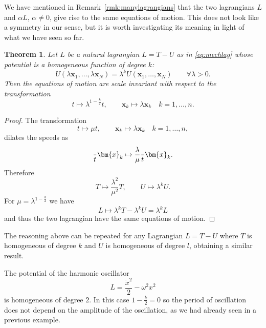 \documentclass[english,fontsize=11pt,paper=a5,oneside]{scrbook}
\newcommand{\bx}{\bm{x}}
\let\d\relax
\newcommand{\d}{\mathrm{d}}
\newtheorem{theorem}{Theorem}[chapter]
\theoremstyle{definition}
\newenvironment{remark}
  {\pushQED{\qed}\renewcommand{\qedsymbol}{$\lozenge$}\remarkx}
  {\popQED\endremarkx}
\newenvironment{example}
  {\pushQED{\qed}\renewcommand{\qedsymbol}{$\lozenge$}\examplex}
  {\popQED\endexamplex}
\begin{document}
We have mentioned in Remark~\ref{rmk:manylagrangians} that the two lagrangians $L$ and $\alpha L$, $\alpha\neq0$, give rise to the same equations of motion.
This does not look like a symmetry in our sense, but it is worth investigating its meaning in light of what we have seen so far.

\begin{theorem}
  Let $L$ be a natural lagrangian $L=T-U$ as in \eqref{eq:mechlag} whose potential is a homogeneous function of degree $k$:
  \begin{equation}
    U(\lambda\bx_1, \ldots, \lambda\bx_N) = \lambda^k U(\bx_1, \ldots, \bx_N)
    \qquad\forall \lambda>0.
  \end{equation}
  Then the equations of motion are scale invariant with respect to the transformation
  \begin{equation}
    t \mapsto \lambda^{1-\frac{k}2} t, \qquad
    \bx_k \mapsto \lambda\bx_k \quad k=1,\ldots,n.
  \end{equation}
\end{theorem}
\begin{proof}
  The transformation
  \begin{equation}
    t \mapsto \mu t, \qquad
    \bx_k \mapsto \lambda\bx_k \quad k=1,\ldots,n,
  \end{equation}
  dilates the speeds as
  \begin{equation}
    \frac{\d}{\d t} \bx_k \mapsto \frac{\lambda}{\mu} \frac{\d}{\d t}\bx_k.
  \end{equation}
  Therefore
  \begin{equation}
    T \mapsto \frac{\lambda^2}{\mu^2} T, \qquad U \mapsto \lambda^k U.
  \end{equation}
  For $\mu = \lambda^{1-\frac{k}2}$ we have
  \begin{equation}
    L \mapsto \lambda^k T - \lambda^k U = \lambda^k L
  \end{equation}
  and thus the two lagrangian have the same equations of motion.
\end{proof}

\begin{remark}
  The reasoning above can be repeated for any Lagrangian $L = T - U$ where $T$ is homogeneous of degree $k$ and $U$ is homogeneous of degree $l$, obtaining a similar result.
\end{remark}

\begin{example}[Harmonic oscillator]
  The potential of the harmonic oscillator
  \begin{equation}
    L = \frac{\dot x^2}2 - \omega^2 x^2
  \end{equation}
  is homogeneous of degree $2$. In this case $1-\frac k2 = 0$ so the period of oscillation does not depend on the amplitude of the oscillation, as we had already seen in a previous example.
\end{example}
\end{document}
